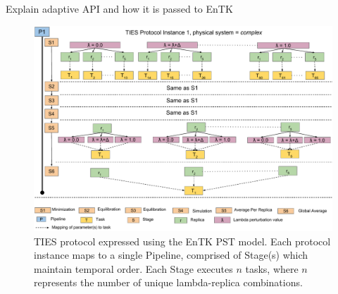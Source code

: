 



Explain adaptive API and how it is passed to EnTK



\begin{figure}
  \centering
   \includegraphics[width=\columnwidth]{figures/_TIES_EnTK_implementation.pdf}
  \caption{TIES protocol expressed using the EnTK PST model. Each protocol 
  instance maps to a single Pipeline, comprised of Stage(s) which maintain 
  temporal order. Each Stage executes $n$ tasks, where $n$ represents the 
  number of unique lambda-replica combinations.}
\label{fig:pst}
\end{figure}


